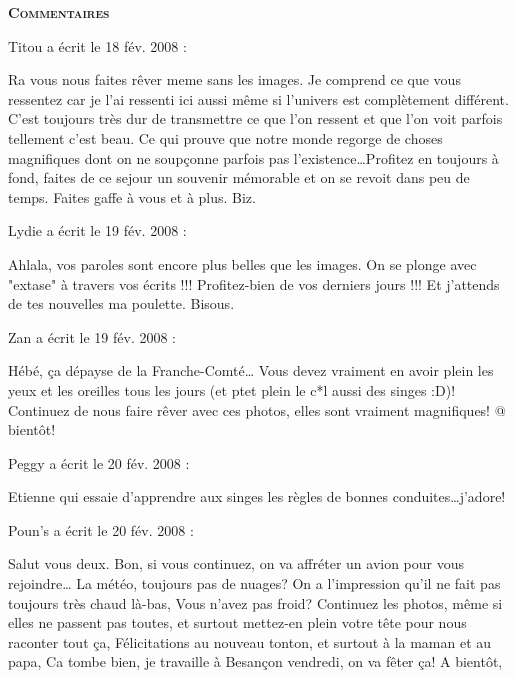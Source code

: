 \bigskip
\textbf{\textsc{Commentaires}}

\medskip
Titou a écrit le 18 fév. 2008 :
\begin{displayquote}
Ra vous nous faites rêver meme sans les images. Je comprend ce que vous ressentez car je l'ai ressenti ici aussi même si l'univers est complètement différent. C'est toujours très dur de transmettre ce que l'on ressent et que l'on voit parfois tellement c'est beau. Ce qui prouve que notre monde regorge de choses magnifiques dont on ne soupçonne parfois pas l'existence\dots Profitez en toujours à fond, faites de ce sejour un souvenir mémorable et on se revoit dans peu de temps. Faites gaffe à vous et à plus. Biz.
\end{displayquote}

\medskip
Lydie a écrit le 19 fév. 2008 :
\begin{displayquote}
Ahlala, vos paroles sont encore plus belles que les images. On se plonge avec "extase" à travers vos écrits !!!
Profitez-bien de vos derniers jours !!! Et j'attends de tes nouvelles ma poulette. Bisous.
\end{displayquote}

\medskip
Zan a écrit le 19 fév. 2008 :
\begin{displayquote}
Hébé, ça dépayse de la Franche-Comté\dots
Vous devez vraiment en avoir plein les yeux et les oreilles tous les jours (et ptet plein le c*l aussi des singes :D)!
Continuez de nous faire rêver avec ces photos, elles sont vraiment magnifiques!
@ bientôt!
\end{displayquote}

\medskip
Peggy a écrit le 20 fév. 2008 :
\begin{displayquote}
Etienne qui essaie d'apprendre aux singes les règles de bonnes conduites\dots j'adore!
\end{displayquote}

\medskip
Poun's a écrit le 20 fév. 2008 :
\begin{displayquote}
Salut vous deux. Bon, si vous continuez, on va affréter un avion pour vous rejoindre\dots
La météo, toujours pas de nuages? On a l'impression qu'il ne fait pas toujours très chaud là-bas, Vous n'avez pas froid?
Continuez les photos, même si elles ne passent pas toutes, et surtout mettez-en plein votre tête pour nous raconter tout ça,
Félicitations au nouveau tonton, et surtout à la maman et au papa,
Ca tombe bien, je travaille à Besançon vendredi, on va fêter ça!
A bientôt,
\end{displayquote}


